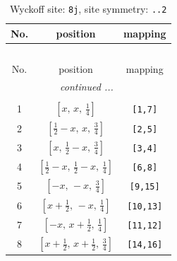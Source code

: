 \documentclass[fleqn,8pt]{jsarticle}
\begin{document}
\begin{longtable}{ccc}
\caption{Wyckoff site: {\tt 8j}, site symmetry: {\tt ..2}}
 \\
 \hline \hline
No. & position & mapping \\ \hline \endfirsthead

\multicolumn{2}{l}{\tablename\ \thetable{}} \\
 \hline \hline
No. & position & mapping \\ \hline \endhead

 \hline \hline
\multicolumn{2}{r}{\footnotesize\it continued ...} \\ \endfoot

 \hline \hline
\multicolumn{2}{r}{} \\ \endlastfoot

1 & $\left[ x,\, x,\, \frac{1}{4} \right]$ & {\tt [1,7]} \\ \hline
2 & $\left[ \frac{1}{2} - x,\, x,\, \frac{3}{4} \right]$ & {\tt [2,5]} \\ \hline
3 & $\left[ x,\, \frac{1}{2} - x,\, \frac{3}{4} \right]$ & {\tt [3,4]} \\ \hline
4 & $\left[ \frac{1}{2} - x,\, \frac{1}{2} - x,\, \frac{1}{4} \right]$ & {\tt [6,8]} \\ \hline
5 & $\left[ - x,\, - x,\, \frac{3}{4} \right]$ & {\tt [9,15]} \\ \hline
6 & $\left[ x + \frac{1}{2},\, - x,\, \frac{1}{4} \right]$ & {\tt [10,13]} \\ \hline
7 & $\left[ - x,\, x + \frac{1}{2},\, \frac{1}{4} \right]$ & {\tt [11,12]} \\ \hline
8 & $\left[ x + \frac{1}{2},\, x + \frac{1}{2},\, \frac{3}{4} \right]$ & {\tt [14,16]} \\
\end{longtable}
\renewcommand{\arraystretch}{1.2}
\end{document}
